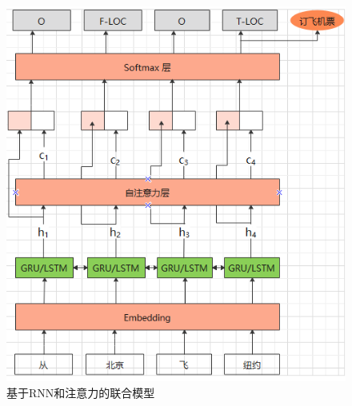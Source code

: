 \documentclass[twoside,a4paper,12pt]{book}%
\begin{document}
\begin{figure}[htbp]
\begin{center}
\includegraphics[width=5.0in]{figures/rnn_att_sl1.png}
\caption{基于RNN和注意力的联合模型}
\label{fig:rnn_att_sl1}
\end{center}
\end{figure}
\end{document}
